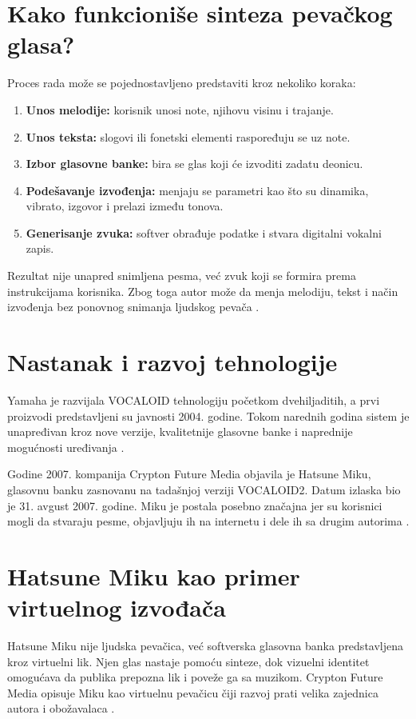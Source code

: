 \documentclass[12pt,a4paper]{article}
\begin{document}
\section{Kako funkcioniše sinteza pevačkog glasa?}
Proces rada može se pojednostavljeno predstaviti kroz nekoliko koraka:
\begin{enumerate}[label=\arabic*.]
  \item \textbf{Unos melodije:} korisnik unosi note, njihovu visinu i trajanje.
  \item \textbf{Unos teksta:} slogovi ili fonetski elementi raspoređuju se uz note.
  \item \textbf{Izbor glasovne banke:} bira se glas koji će izvoditi zadatu deonicu.
  \item \textbf{Podešavanje izvođenja:} menjaju se parametri kao što su dinamika, vibrato, izgovor i prelazi između tonova.
  \item \textbf{Generisanje zvuka:} softver obrađuje podatke i stvara digitalni vokalni zapis.
\end{enumerate}

Rezultat nije unapred snimljena pesma, već zvuk koji se formira prema instrukcijama korisnika. Zbog toga autor može da menja melodiju, tekst i način izvođenja bez ponovnog snimanja ljudskog pevača \cite{yamahaVOCALOID,yamahaAI}.

\section{Nastanak i razvoj tehnologije}
Yamaha je razvijala VOCALOID tehnologiju početkom dvehiljaditih, a prvi proizvodi predstavljeni su javnosti 2004. godine. Tokom narednih godina sistem je unapređivan kroz nove verzije, kvalitetnije glasovne banke i naprednije mogućnosti uređivanja \cite{vocaloidHistory}.

Godine 2007. kompanija Crypton Future Media objavila je Hatsune Miku, glasovnu banku zasnovanu na tadašnjoj verziji VOCALOID2. Datum izlaska bio je 31. avgust 2007. godine. Miku je postala posebno značajna jer su korisnici mogli da stvaraju pesme, objavljuju ih na internetu i dele ih sa drugim autorima \cite{vocaloidHistory,cryptonMiku}.

\section{Hatsune Miku kao primer virtuelnog izvođača}
Hatsune Miku nije ljudska pevačica, već softverska glasovna banka predstavljena kroz virtuelni lik. Njen glas nastaje pomoću sinteze, dok vizuelni identitet omogućava da publika prepozna lik i poveže ga sa muzikom. Crypton Future Media opisuje Miku kao virtuelnu pevačicu čiji razvoj prati velika zajednica autora i obožavalaca \cite{cryptonMiku}.
\end{document}
